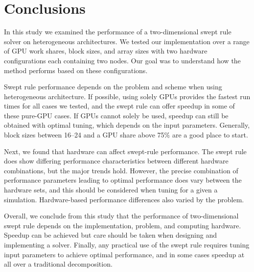 \documentclass[preprints,article,accept,moreauthors,pdftex]{Definitions/mdpi}
\begin{document}
\section{Conclusions}
\label{conclusions-section}

In this study we examined the performance of a two-dimensional swept rule solver on heterogeneous architectures. 
We tested our implementation over a range of GPU work shares, block sizes, and array sizes with two hardware configurations each containing two nodes. 
Our goal was to understand how the method performs based on these configurations.

Swept rule performance depends on the problem and scheme when using heterogeneous architecture. 
If possible, using solely GPUs provides the fastest run times for all cases we tested, and the swept rule can offer speedup in some of these pure-GPU cases. 
If GPUs cannot solely be used, speedup can still be obtained with optimal tuning, which depends on the input parameters. 
Generally, block sizes between 16--24 and a GPU share above 75\% are a good place to start.

Next, we found that hardware can affect swept-rule performance. 
The swept rule does show differing performance characteristics between different hardware combinations, but the major trends hold. 
However, the precise combination of performance parameters leading to optimal performance does vary between the hardware sets, and this should be considered when tuning for a given a simulation. Hardware-based performance differences also varied by the problem.

Overall, we conclude from this study that the performance of two-dimensional swept rule depends on the implementation, problem, and computing hardware. 
Speedup can be achieved but care should be taken when designing and implementing a solver. 
Finally, any practical use of the swept rule requires tuning input parameters to achieve optimal performance, 
and in some cases speedup at all over a traditional decomposition.

\vspace{6pt} 

\end{document}
